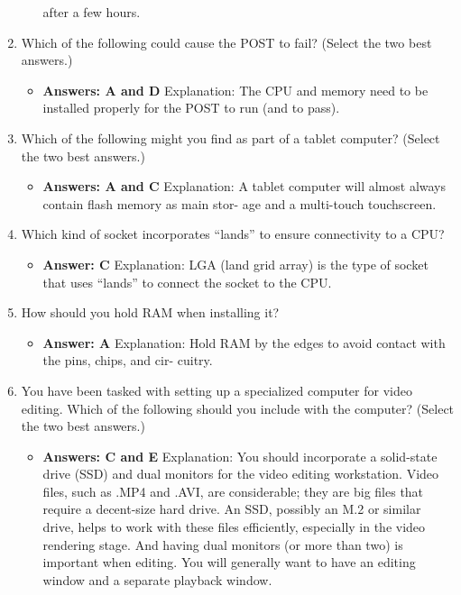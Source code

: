 \documentclass{article}
\begin{document}
\begin{enumerate}
\begin{itemize}
after a few hours.
    \end{itemize}
    \item Which of the following could cause the POST to fail? (Select the
two best answers.)
    \begin{itemize}
        \item \textbf{Answers: A and D} 
Explanation: The CPU and memory need to be installed properly for the POST to run
(and to pass).
    \end{itemize}
    \item Which of the following might you find as part of a tablet
computer? (Select the two best answers.)
    \begin{itemize}
        \item \textbf{Answers: A and C}
Explanation: A tablet computer will almost always contain flash memory as main stor-
age and a multi-touch touchscreen.
    \end{itemize}
    \item Which kind of socket incorporates “lands” to ensure connectivity
to a CPU?
    \begin{itemize}
        \item \textbf{Answer: C}
Explanation: LGA (land grid array) is the type of socket that uses “lands” to connect
the socket to the CPU.
    \end{itemize}
     \item How should you hold RAM when installing it?
    \begin{itemize}
        \item  \textbf{Answer: A} Explanation: Hold RAM by the edges to avoid contact with the pins, chips, and cir-
cuitry.
    \end{itemize}
     \item You have been tasked with setting up a specialized computer for
video editing. Which of the following should you include with the
computer? (Select the two best answers.)
    \begin{itemize}
        \item \textbf{Answers: C and E}
Explanation: You should incorporate a solid-state drive (SSD) and dual monitors for
the video editing workstation. Video files, such as .MP4 and .AVI, are considerable;
they are big files that require a decent-size hard drive. An SSD, possibly an M.2 or
similar drive, helps to work with these files efficiently, especially in the video rendering
stage. And having dual monitors (or more than two) is important when editing. You will
generally want to have an editing window and a separate playback window.

\end{itemize}
\end{enumerate}
\end{document}
